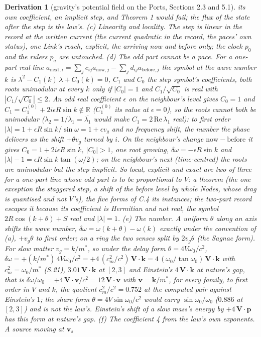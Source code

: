 \documentclass[pdflatex,sn-mathphys-num]{sn-jnl}
\theoremstyle{thmstyleone}
\newtheorem{derivation}{Derivation}
\begin{document}
\begin{derivation}[gravity's potential field on the Ports, Sections 2.3 and 5.1]
its own coefficient, an implicit step, and Theorem 1 would fail; the flux of the state after the step is the law's. (c) \emph{Linearity and locality.} The step is linear in the record at the written current (the current quadratic in the record, the paces' own status), one Link's reach, explicit, the arriving now and before only; the clock $p_0$ and the rulers $p_a$ are untouched. (d) \emph{The odd part cannot be a pace.} For a one-part real line $a_{\mathrm{next},i} = \sum_j c_{ij}a_{\mathrm{now},j} - \sum_j d_{ij}a_{\mathrm{before},j}$ the symbol at the wave number $k$ is $\lambda^2 - C_1(k)\,\lambda + C_0(k) = 0$, $C_1$ and $C_0$ the step symbol's coefficients, both roots unimodular at every $k$ only if $|C_0| = 1$ and $C_1 / \sqrt{C_0}$ is real with $|C_1 / \sqrt{C_0}| \le 2$. An odd real coefficient $\epsilon$ on the neighbour's level gives $C_0 = 1$ and $C_1 = C_1^{(0)} + 2i\epsilon R\sin k \notin \mathbb R$ ($C_1^{(0)}$ its value at $\epsilon = 0$), so the roots cannot both be unimodular ($\lambda_2 = 1 / \lambda_1 = \overline{\lambda_1}$ would make $C_1 = 2\,\mathrm{Re}\,\lambda_1$ real): to first order $|\lambda| = 1 + \epsilon R\sin k / \sin\omega = 1 + \epsilon v_g$ and no frequency shift, the number the phase delivers as the shift $+\theta v_g$ turned by $i$. On the neighbour's change $\mathrm{now} - \mathrm{before}$ it gives $C_0 = 1 + 2i\epsilon R\sin k$, $|C_0| > 1$, one root growing, $\delta\omega = -\epsilon R\sin k$ and $|\lambda| - 1 = \epsilon R\sin k\tan(\omega / 2)$; on the neighbour's next (time-centred) the roots are unimodular but the step implicit. So local, explicit and exact are two of three for a one-part line whose odd part is to be proportional to $V$: a theorem (the one exception the staggered step, a shift of the before level by whole Nodes, whose drag is quantised and not $V$'s), the five forms of C.4 its instances; the two-part record escapes it because its coefficient is Hermitian and not real, the symbol $2R\cos(k + \theta) + S$ real and $|\lambda| = 1$. (e) \emph{The number.} A uniform $\theta$ along an axis shifts the wave number, $\delta\omega = \omega(k + \theta) - \omega(k)$ exactly under the convention of (a), $+v_g\theta$ to first order; on a ring the two senses split by $2v_g\theta$ (the Sagnac form). For slow matter $v_g = k / m^*$, so under the delay form $\theta = 4V\omega_0 / c^2$, $\delta\omega = +(k / m^*)\,4V\omega_0 / c^2 = +4\,(c_m^2 / c^2)\,\mathbf V\cdot\mathbf k = 4\,(\omega_0 / \tan\omega_0)\,\mathbf V\cdot\mathbf k$ with $c_m^2 = \omega_0 / m^*$ (S.21), $3.01\,\mathbf V\cdot\mathbf k$ at $[2, 3]$ and Einstein's $4\,\mathbf V\cdot\mathbf k$ at nature's gap, that is $\delta\omega / \omega_0 = +4\,\mathbf V\cdot\mathbf v / c^2 = 12\,\mathbf V\cdot\mathbf v$ with $\mathbf v = \mathbf k / m^*$, for every family, to first order in $V$ and $k$, the quotient $c_m^2 / c^2 = 0.752$ at the computed pair against Einstein's $1$; the share form $\theta = 4V\sin\omega_0 / c^2$ would carry $\sin\omega_0 / \omega_0$ ($0.886$ at $[2, 3]$) and is not the law's. Einstein's shift of a slow mass's energy by $+4\,\mathbf V\cdot\mathbf p$ has this form at nature's gap. (f) \emph{The coefficient 4 from the law's own exponents.} A source moving at $\mathbf v_s$ 
\end{derivation}
\end{document}
